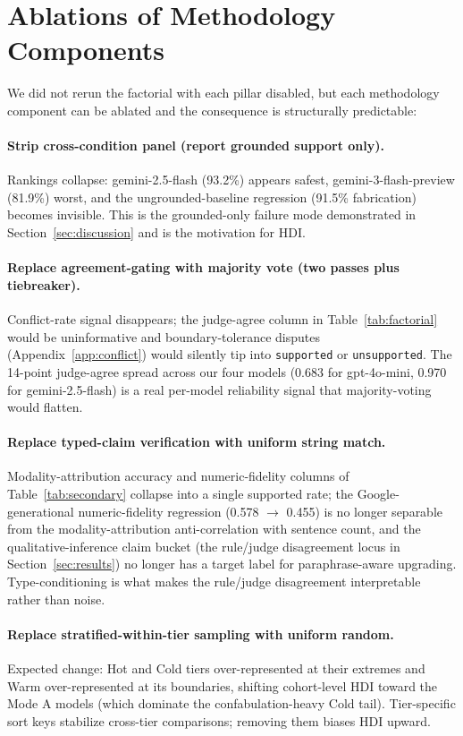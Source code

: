 \documentclass{article}
\theoremstyle{plain}
\begin{document}
\section{Ablations of Methodology Components}
\label{app:ablations}

We did not rerun the factorial with each pillar disabled, but each methodology component can be ablated and the consequence is structurally predictable:

\paragraph{Strip cross-condition panel (report grounded support only).} Rankings collapse: gemini-2.5-flash (93.2\%) appears safest, gemini-3-flash-preview (81.9\%) worst, and the ungrounded-baseline regression (91.5\% fabrication) becomes invisible. This is the grounded-only failure mode demonstrated in Section~\ref{sec:discussion} and is the motivation for HDI.

\paragraph{Replace agreement-gating with majority vote (two passes plus tiebreaker).} Conflict-rate signal disappears; the judge-agree column in Table~\ref{tab:factorial} would be uninformative and boundary-tolerance disputes (Appendix~\ref{app:conflict}) would silently tip into \texttt{supported} or \texttt{unsupported}. The 14-point judge-agree spread across our four models (0.683 for gpt-4o-mini, 0.970 for gemini-2.5-flash) is a real per-model reliability signal that majority-voting would flatten.

\paragraph{Replace typed-claim verification with uniform string match.} Modality-attribution accuracy and numeric-fidelity columns of Table~\ref{tab:secondary} collapse into a single supported rate; the Google-generational numeric-fidelity regression (0.578 $\to$ 0.455) is no longer separable from the modality-attribution anti-correlation with sentence count, and the qualitative-inference claim bucket (the rule/judge disagreement locus in Section~\ref{sec:results}) no longer has a target label for paraphrase-aware upgrading. Type-conditioning is what makes the rule/judge disagreement interpretable rather than noise.

\paragraph{Replace stratified-within-tier sampling with uniform random.} Expected change: Hot and Cold tiers over-represented at their extremes and Warm over-represented at its boundaries, shifting cohort-level HDI toward the Mode A models (which dominate the confabulation-heavy Cold tail). Tier-specific sort keys stabilize cross-tier comparisons; removing them biases HDI upward.
\end{document}
